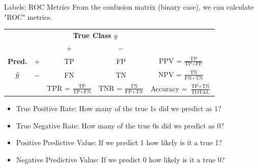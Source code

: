 \documentclass[11pt,compress,t,notes=noshow, xcolor=table]{beamer}
\begin{document}
\begin{vbframe}{Labels: ROC Metrics}
From the confusion matrix (binary case), we can calculate "ROC" metrics.



\begin{center}
\small
\renewcommand{\arraystretch}{1.5}
\begin{tabular}{cc||cc|c}
    & & \multicolumn{2}{c|}{\bfseries True Class $y$} & \\
    & & $+$ & $-$ & \\
    \hline \hline
    \bfseries Pred.     & $+$ & TP & FP & PPV = $\frac{\text{TP}}{\text{TP} + \text{FP}}$\\
              $\hat{y}$ & $-$ & FN & TN & NPV = $\frac{\text{TN}}{\text{FN} + \text{TN}}$\\
    \hline
    & & TPR = $\frac{\text{TP}}{\text{TP} + \text{FN}}$ & TNR = $\frac{\text{TN}}{\text{FP} + \text{TN}}$ & Accuracy = $\frac{\text{TP}+ \text{TN}}{\text{TOTAL}}$
\end{tabular}
\renewcommand{\arraystretch}{1}
\end{center}

\begin{itemize}
  \item True Positive Rate: How many of the true 1s did we predict as 1?
  \item True Negative Rate: How many of the true 0s did we predict as 0?
  \item Positive Predictive Value: If we predict 1 how likely is it a true 1?
  \item Negative Predictive Value: If we predict 0 how likely is it a true 0?
\end{itemize}
\end{vbframe}
\end{document}
